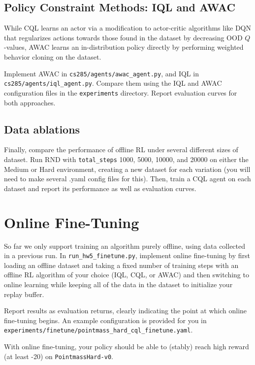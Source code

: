 \documentclass{article}
\begin{document}
\subsection{Policy Constraint Methods: IQL and AWAC}
While CQL learns an actor via a modification to actor-critic algorithms like DQN that regularizes actions towards those found in the dataset by decreasing OOD $Q$-values, AWAC learns an in-distribution policy directly by performing weighted behavior cloning on the dataset.

Implement AWAC in \verb+cs285/agents/awac_agent.py+, and IQL in \verb+cs285/agents/iql_agent.py+. Compare them using the IQL and AWAC configuration files in the \verb+experiments+ directory. Report evaluation curves for both approaches.

\subsection{Data ablations}
Finally, compare the performance of offline RL under several different sizes of dataset. Run RND with \verb+total_steps+ 1000, 5000, 10000, and 20000 on either the Medium or Hard environment, creating a new dataset for each variation (you will need to make several .yaml config files for this). Then, train a CQL agent on each dataset and report its performance as well as evaluation curves.

\section{Online Fine-Tuning}
So far we only support training an algorithm purely offline, using data collected in a previous run. In \verb+run_hw5_finetune.py+, implement online fine-tuning by first loading an offline dataset and taking a fixed number of training steps with an offline RL algorithm of your choice (IQL, CQL, or AWAC) and then switching to online learning while keeping all of the data in the dataset to initialize your replay buffer.

Report results as evaluation returns, clearly indicating the point at which online fine-tuning begins. An example configuration is provided for you in \verb+experiments/finetune/pointmass_hard_cql_finetune.yaml+.

With online fine-tuning, your policy should be able to (stably) reach high reward (at least -20) on \verb+PointmassHard-v0+.
\end{document}
